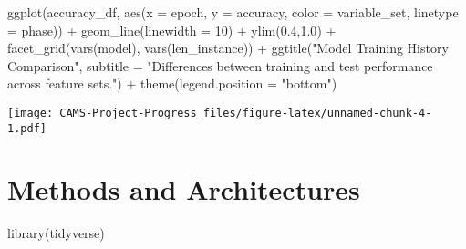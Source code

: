\documentclass[
]{book}
\newenvironment{Shaded}{\begin{snugshade}}{\end{snugshade}}
\newcommand{\AttributeTok}[1]{\textcolor[rgb]{0.77,0.63,0.00}{#1}}
\newcommand{\DecValTok}[1]{\textcolor[rgb]{0.00,0.00,0.81}{#1}}
\newcommand{\FloatTok}[1]{\textcolor[rgb]{0.00,0.00,0.81}{#1}}
\newcommand{\FunctionTok}[1]{\textcolor[rgb]{0.00,0.00,0.00}{#1}}
\newcommand{\NormalTok}[1]{#1}
\newcommand{\SpecialCharTok}[1]{\textcolor[rgb]{0.00,0.00,0.00}{#1}}
\newcommand{\StringTok}[1]{\textcolor[rgb]{0.31,0.60,0.02}{#1}}
\begin{document}
\begin{Shaded}
\begin{Highlighting}[]
\FunctionTok{ggplot}\NormalTok{(accuracy\_df, }\FunctionTok{aes}\NormalTok{(}\AttributeTok{x =}\NormalTok{ epoch, }\AttributeTok{y =}\NormalTok{ accuracy, }\AttributeTok{color =}\NormalTok{ variable\_set, }\AttributeTok{linetype =}\NormalTok{ phase)) }\SpecialCharTok{+} 
  \FunctionTok{geom\_line}\NormalTok{(}\AttributeTok{linewidth =} \DecValTok{10}\NormalTok{) }\SpecialCharTok{+} 
  \FunctionTok{ylim}\NormalTok{(}\FloatTok{0.4}\NormalTok{,}\FloatTok{1.0}\NormalTok{) }\SpecialCharTok{+}
  \FunctionTok{facet\_grid}\NormalTok{(}\FunctionTok{vars}\NormalTok{(model), }\FunctionTok{vars}\NormalTok{(len\_instance)) }\SpecialCharTok{+}
  \FunctionTok{ggtitle}\NormalTok{(}\StringTok{"Model Training History Comparison"}\NormalTok{, }\AttributeTok{subtitle =} \StringTok{"Differences between training and test performance across feature sets."}\NormalTok{) }\SpecialCharTok{+} \FunctionTok{theme}\NormalTok{(}\AttributeTok{legend.position =} \StringTok{"bottom"}\NormalTok{)}
\end{Highlighting}
\end{Shaded}

\texttt{[image: CAMS-Project-Progress\_files/figure-latex/unnamed-chunk-4-1.pdf]}

\hypertarget{performance}{%
\chapter{Methods and Architectures}\label{performance}}

\begin{Shaded}
\begin{Highlighting}[]
\FunctionTok{library}\NormalTok{(tidyverse)}
\end{Highlighting}
\end{Shaded}
\end{document}
